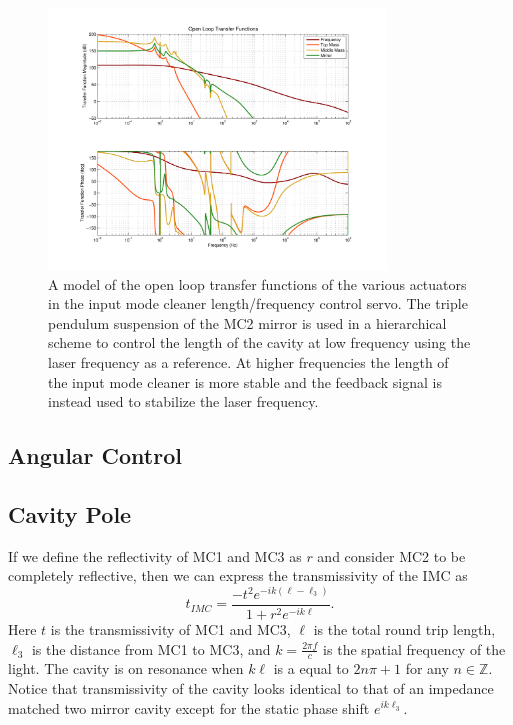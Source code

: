 \documentclass[10pt,a4paper]{article}
\begin{document}
\begin{figure}
	\centering
	\includegraphics[width=0.8\textwidth,trim = 2.5cm 2cm 2.5cm 1.5cm]{Open_Loop_Tfs.pdf}
	\caption{A model of the open loop transfer functions of the various actuators in the 
		input mode cleaner length/frequency control servo.  
		The triple pendulum suspension of the MC2 mirror is used in a hierarchical scheme to 
		control the length of the cavity at low frequency using the laser frequency as a reference.  
		At higher frequencies the length of the input mode cleaner is more stable and the feedback 
		signal is instead used to stabilize the laser frequency.}
	\label{fig:ControlLoops}
\end{figure}		


\subsection{Angular Control}

\subsection{Cavity Pole}
If we define the reflectivity of MC1 and MC3 as $r$ and consider MC2 to be completely reflective, 
then we can express the transmissivity of the IMC as
\begin{equation}
	t_{IMC}=\frac{-t^2e^{-ik(\ell-\ell_3)}}{1+r^2e^{-ik\ell}}.
\end{equation}
Here $t$ is the transmissivity of MC1 and MC3, $\ell$ is the total round trip length, 
$\ell_3$ is the distance from MC1 to MC3, and $k=\tfrac{2\pi f}{c}$ is the spatial frequency 
of the light.  
The cavity is on resonance when $k\ell$ is a equal to $2n\pi+1$ for any $n\in\mathbb{Z}$.  
Notice that transmissivity of the cavity looks identical to that of an impedance matched 
two mirror cavity except for the static phase shift $e^{ik\ell_3}$.  
\end{document}
